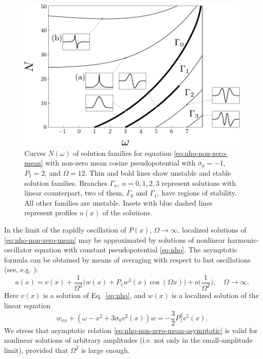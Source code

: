 \begin{figure}[h]
\centering
	\includegraphics[scale = 1]{pic/branches for cosine nho, case (b)}
	\caption{
		Curves $N(\omega)$ of solution families for equation \eqref{eq:nho-non-zero-mean} with non-zero mean cosine pseudopotential with $\sigma_0 = -1$, $P_1 = 2$, and $\Omega = 12$.
		Thin and bold lines show unstable and stable solution families.
		Branches $\Gamma_n$, $n = 0, 1, 2, 3$ represent solutions with linear counterpart, two of them, $\Gamma_0$ and $\Gamma_1$, have regions of stability.
		All other families are unstable.
		Insets with blue dashed lines represent profiles $u(x)$ of the solutions.
	}
\label{fig:branches-nho-periodic-repulsive}
\end{figure}

In the limit of the rapidly oscillation of $P(x)$, $\Omega \to \infty$, localized solutions of \eqref{eq:nho-non-zero-mean} may be approximated by solutions of nonlinear harmonic-oscillator equation with constant pseudopotential \eqref{eq:nho}.
The asymptotic formula can be obtained by means of averaging with respect to fast oscillations (see, e.g. \cite{AbdullaevCaputoKraenkelMalomed}):
\begin{equation}
	u(x) = v(x) + \frac{1}{\Omega^2} \bigg( w(x) + P_1 w^3(x) \cos (\Omega x) \bigg) + o \bigg( \frac{1}{\Omega^2} \bigg), \quad \Omega \to \infty.
\label{eq:nho-non-zero-mean-asymptotic}
\end{equation}
Here $v(x)$ is a solution of Eq.~\eqref{eq:nho}, and $w(x)$ is a localized solution of the linear equation
\begin{equation}
	w_{xx} + (\omega - x^2 + 3 \sigma_0 v^2(x)) w = -\frac{3}{2} P_1^2 v^5(x).
\end{equation}
We stress that asymptotic relation \eqref{eq:nho-non-zero-mean-asymptotic} is valid for nonlinear solutions of arbitrary amplitudes (i.e. not only in the small-amplitude limit), provided that $\Omega^2$ is large enough.

